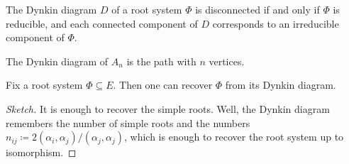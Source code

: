 \documentclass{article}
\begin{document}
\begin{remark}
	The Dynkin diagram $D$ of a root system $\Phi$ is disconnected if and only if $\Phi$ is reducible, and each connected component of $D$ corresponds to an irreducible component of $\Phi$.
\end{remark}
\begin{example}
	The Dynkin diagram of $A_n$ is the path with $n$ vertices.
\end{example}
\begin{lemma} \label{lem:root-to-dynkin}
	Fix a root system $\Phi\subseteq E$. Then one can recover $\Phi$ from its Dynkin diagram.
\end{lemma}
\begin{proof}[Sketch]
	It is enough to recover the simple roots. Well, the Dynkin diagram remembers the number of simple roots and the numbers $n_{ij}\coloneqq2(\alpha_i,\alpha_j)/(\alpha_j,\alpha_j)$, which is enough to recover the root system up to isomorphism.
\end{proof}
\end{document}
